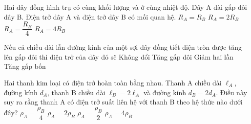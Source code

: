 \begin{ex}%
Hai dây đồng hình trụ có cùng khối lượng và ở cùng nhiệt độ. Dây A dài gấp đôi dây B. Điện trở dây A và điện trở dây B có mối quan hệ.
\choice
{$R_A = R_B$}
{$R_A = 2R_B$}
{$R_A = \dfrac{R_B}{4}$}
{\True $R_A = 4R_B$}
\end{ex}
\begin{ex}%
Nếu cả chiều dài lẫn đường kính của một sợi dây đồng tiết diện tròn được tăng lên gấp đôi thì điện trở của dây đó sẽ
\choice
{Không đổi}
{Tăng gấp đôi}
{\True Giảm hai lần}
{Tăng gấp bốn}
\end{ex}
\begin{ex}%
Hai thanh kim loại có điện trở hoàn toàn bằng nhau. Thanh A chiều dài $\ell_A$, đường kính $d_A$, thanh
B chiều dài $\ell_B = 2\ell_A$ và đường kính $d_B = 2d_A$. Điều này suy ra rằng thanh A có điện trở suất liên hệ với thanh B theo hệ thức nào dưới đây?
\choice
{$\rho_A = \dfrac{\rho_B}{4}$}
{$\rho_A = 2\rho_B$}
{\True $\rho_A = \dfrac{\rho_B}{2}$}
{$\rho_A = 4\rho_B$}
\end{ex}

